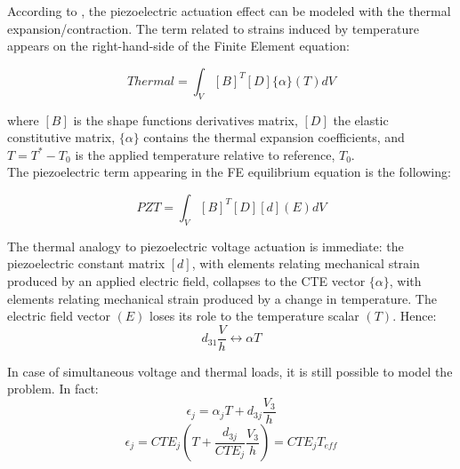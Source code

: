 \documentclass[twocolumn,a4paper,10pt,english]{article}
\begin{document}
        According to \cite{c5}, the piezoelectric actuation effect can be modeled with the thermal expansion/contraction. The term related to strains induced by temperature appears on the right-hand-side of the Finite Element equation:
    
        \begin{equation}
            Thermal= \int_V [B]^T[D]\{\alpha\}(T)dV
        \end{equation}
        
        where $[B]$ is the shape functions derivatives matrix, $[D]$ the elastic constitutive matrix, $\{\alpha\}$ contains the thermal expansion coefficients, and $T = T^*-T_0$ is the applied temperature relative to reference, $T_0$.\\
        The piezoelectric term appearing in the FE equilibrium equation is the following:
        
        \begin{equation}
        	PZT= \int_V [B]^T[D][d](E)dV
        \end{equation}
	    
	   
        The thermal analogy to piezoelectric voltage actuation is immediate: the piezoelectric constant matrix $[d]$, with elements relating mechanical strain produced by an applied electric field, collapses to the CTE vector $\{\alpha\}$, with elements relating mechanical strain produced by a change in temperature. The electric field vector $(E)$ loses its role to the temperature scalar $(T)$. Hence:
        \begin{equation}
        {d_{31}}\frac{V}{h}\leftrightarrow \alpha T
        \end{equation}
        
         In case of simultaneous voltage and thermal loads, it is still possible to model the problem. In fact:
         \begin{equation}
         \epsilon_j=\alpha_j T+ d_{3j}\frac{V_3}{h}
         \end{equation}
         \begin{equation}
         \epsilon_j=CTE_j(T+\frac{d_{3j}}{CTE_j} \frac{V_3}{h})=CTE_jT_{eff}
         \end{equation}
        
\end{document}
